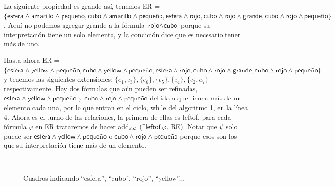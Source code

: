 La siguiente propiedad es \textsf{grande} as\'i, tenemos ER = $\{\textsf{esfera} \wedge \textsf{amarillo} \wedge \textsf{peque\~no}, \textsf{cubo} \wedge \textsf{amarillo} \wedge \textsf{peque\~no}, \textsf{esfera} \wedge \textsf{rojo}, \textsf{cubo} \wedge \textsf{rojo} \wedge \textsf{grande}, \textsf{cubo} \wedge \textsf{rojo} \wedge \textsf{peque\~no}\}$. Aqu\'i no podemos agregar \textsf{grande} a la f\'ormula $\textsf{rojo} \wedge \textsf{cubo}$ porque su interpretaci\'on tiene un solo elemento, y la condici\'on dice que es necesario tener m\'as de uno.

Hasta ahora ER = $\{\textsf{esfera} \wedge \textsf{yellow} \wedge \textsf{peque\~no}, \textsf{cubo} \wedge \textsf{yellow} \wedge \textsf{peque\~no}, \textsf{esfera} \wedge \textsf{rojo}, \textsf{cubo} \wedge \textsf{rojo} \wedge \textsf{grande}, \textsf{cubo} \wedge \textsf{rojo} \wedge \textsf{peque\~no}\}$ 
y tenemos las siguientes extensiones: $\{e_1, e_3\}, \{e_6\}, \{e_5\}, \{e_4\}, \{e_2, e_7\}$ respectivamente. 
Hay dos f\'ormulas que a\'un pueden ser refinadas, $\textsf{esfera} \wedge \textsf{yellow} \wedge \textsf{peque\~no}$ y $\textsf{cubo} \wedge \textsf{rojo} \wedge \textsf{peque\~no}$ 
debido a que tienen m\'as de un elemento cada una, por lo que entran en el ciclo, while del algoritmo 1, en la l\'inea 4. Ahora es el turno de las relaciones, la primera de ellas es \textsf{leftof}, para cada f\'ormula $\varphi$ en ER trataremos de hacer add$_\mathcal{EL}$ ($\exists \textsf{leftof}.\varphi$, RE). Notar que $\psi$ solo puede ser $\textsf{esfera} \wedge \textsf{yellow} \wedge \textsf{peque\~no}$ o $\textsf{cubo} \wedge \textsf{rojo} \wedge \textsf{peque\~no}$ porque esos son los que su interpretaci\'on tiene m\'as de un elemento. 
\begin{figure}[ht]
\begin{center}
\\[0pt]
\caption{Cuadros indicando ``esfera'', ``cubo'', ``rojo'', ``yellow''...}
\label{fig-modelo15}
\end{center}
\end{figure}


